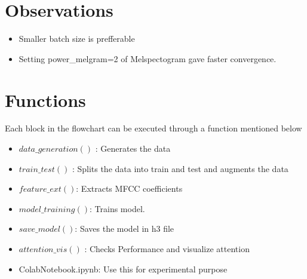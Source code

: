 \documentclass[11pt,english]{article}
\begin{document}
\section{Observations}
\begin{itemize}
    \item Smaller batch size is prefferable
    \item Setting power\_melgram=2 of Melspectogram gave faster convergence.
\end{itemize}
\section{Functions}
Each block in the flowchart can be executed through a function mentioned below 
\begin{itemize}
    \item $data\_generation()$ : Generates the data
    \item $train\_test()$ : Splits the data into train and test and augments the data
    \item $feature\_ext()$: Extracts MFCC coefficients
    \item $model\_training()$: Trains model.
    \item $save\_model()$: Saves the model in h3 file
    \item $attention\_vis()$ : Checks Performance and visualize attention
    \item ColabNotebook.ipynb: Use this for experimental purpose
\end{itemize}
\end{document}
